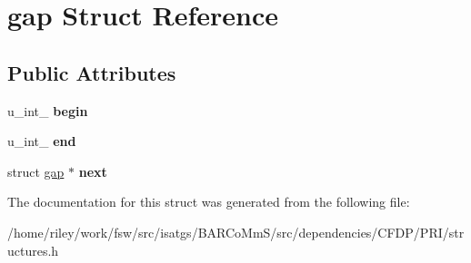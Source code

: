\hypertarget{structgap}{}\section{gap Struct Reference}
\label{structgap}
\subsection*{Public Attributes}
\begin{DoxyCompactItemize}
\item 
u\+\_\+int\+\_ {\bfseries begin}\hypertarget{structgap_a12391414ff856122bc95438776497cbd}{}\label{structgap_a12391414ff856122bc95438776497cbd}

\item 
u\+\_\+int\+\_ {\bfseries end}\hypertarget{structgap_a503365cbf83e5bb8917f912403f39e3a}{}\label{structgap_a503365cbf83e5bb8917f912403f39e3a}

\item 
struct \hyperlink{structgap}{gap} $\ast$ {\bfseries next}\hypertarget{structgap_ad2570b6ec1c81c481d237cce1e195cfa}{}\label{structgap_ad2570b6ec1c81c481d237cce1e195cfa}

\end{DoxyCompactItemize}


The documentation for this struct was generated from the following file\+:\begin{DoxyCompactItemize}
\item 
/home/riley/work/fsw/src/isatgs/\+B\+A\+R\+Co\+Mm\+S/src/dependencies/\+C\+F\+D\+P/\+P\+R\+I/structures.\+h\end{DoxyCompactItemize}
